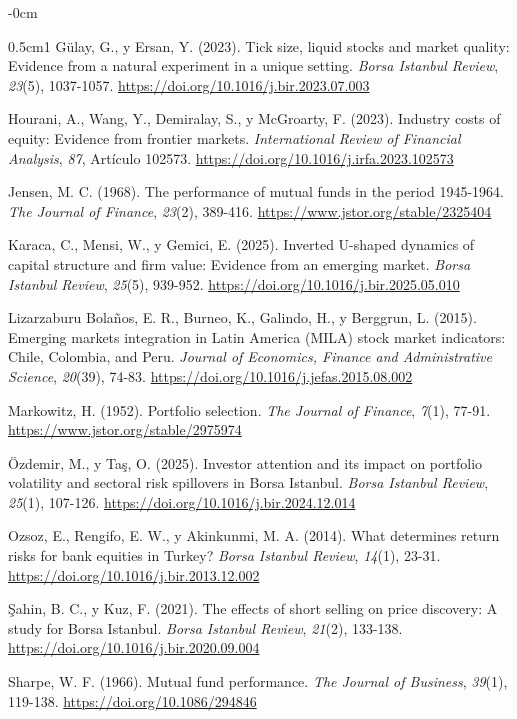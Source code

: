 \documentclass[jrfm,article,submit,oneauthor]{Definitions/mdpi}
\begin{document}
\begin{adjustwidth}{-\extralength}{0cm}
{\begin{hangparas}{0.5cm}{1}
Gülay, G., y Ersan, Y. (2023). Tick size, liquid stocks and market quality: Evidence from a natural experiment in a unique setting. \textit{Borsa Istanbul Review}, \textit{23}(5), 1037-1057. \url{https://doi.org/10.1016/j.bir.2023.07.003}

Hourani, A., Wang, Y., Demiralay, S., y McGroarty, F. (2023). Industry costs of equity: Evidence from frontier markets. \textit{International Review of Financial Analysis}, \textit{87}, Artículo 102573. \url{https://doi.org/10.1016/j.irfa.2023.102573}

Jensen, M. C. (1968). The performance of mutual funds in the period 1945-1964. \textit{The Journal of Finance}, \textit{23}(2), 389-416. \url{https://www.jstor.org/stable/2325404}

Karaca, C., Mensi, W., y Gemici, E. (2025). Inverted U-shaped dynamics of capital structure and firm value: Evidence from an emerging market. \textit{Borsa Istanbul Review}, \textit{25}(5), 939-952. \url{https://doi.org/10.1016/j.bir.2025.05.010}

Lizarzaburu Bolaños, E. R., Burneo, K., Galindo, H., y Berggrun, L. (2015). Emerging markets integration in Latin America (MILA) stock market indicators: Chile, Colombia, and Peru. \textit{Journal of Economics, Finance and Administrative Science}, \textit{20}(39), 74-83. \url{https://doi.org/10.1016/j.jefas.2015.08.002}

Markowitz, H. (1952). Portfolio selection. \textit{The Journal of Finance}, \textit{7}(1), 77-91. \url{https://www.jstor.org/stable/2975974}

Özdemir, M., y Taş, O. (2025). Investor attention and its impact on portfolio volatility and sectoral risk spillovers in Borsa Istanbul. \textit{Borsa Istanbul Review}, \textit{25}(1), 107-126. \url{https://doi.org/10.1016/j.bir.2024.12.014}

Ozsoz, E., Rengifo, E. W., y Akinkunmi, M. A. (2014). What determines return risks for bank equities in Turkey? \textit{Borsa Istanbul Review}, \textit{14}(1), 23-31. \url{https://doi.org/10.1016/j.bir.2013.12.002}

Şahin, B. C., y Kuz, F. (2021). The effects of short selling on price discovery: A study for Borsa Istanbul. \textit{Borsa Istanbul Review}, \textit{21}(2), 133-138. \url{https://doi.org/10.1016/j.bir.2020.09.004}

Sharpe, W. F. (1966). Mutual fund performance. \textit{The Journal of Business}, \textit{39}(1), 119-138. \url{https://doi.org/10.1086/294846}


\end{hangparas}}
\end{adjustwidth}
\end{document}

